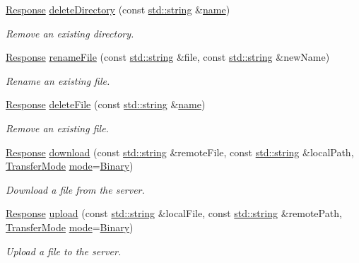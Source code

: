 \begin{DoxyCompactItemize}
\hyperlink{classsf_1_1_ftp_1_1_response}{Response} \hyperlink{classsf_1_1_ftp_a2a8a7ef9144204b5b319c9a4be8806c2}{delete\-Directory} (const \hyperlink{gl3_8h_ac83513893df92266f79a515488701770}{std\-::string} \&\hyperlink{gl3_8h_aaced7cfc21e7d37775d6921bb8177239}{name})
\begin{DoxyCompactList}\small\item\em Remove an existing directory. \end{DoxyCompactList}\item 
\hyperlink{classsf_1_1_ftp_1_1_response}{Response} \hyperlink{classsf_1_1_ftp_a8f99251d7153e1dc26723e4006deb764}{rename\-File} (const \hyperlink{gl3_8h_ac83513893df92266f79a515488701770}{std\-::string} \&file, const \hyperlink{gl3_8h_ac83513893df92266f79a515488701770}{std\-::string} \&new\-Name)
\begin{DoxyCompactList}\small\item\em Rename an existing file. \end{DoxyCompactList}\item 
\hyperlink{classsf_1_1_ftp_1_1_response}{Response} \hyperlink{classsf_1_1_ftp_a8aa272b0eb7769a850006e70fcad370f}{delete\-File} (const \hyperlink{gl3_8h_ac83513893df92266f79a515488701770}{std\-::string} \&\hyperlink{gl3_8h_aaced7cfc21e7d37775d6921bb8177239}{name})
\begin{DoxyCompactList}\small\item\em Remove an existing file. \end{DoxyCompactList}\item 
\hyperlink{classsf_1_1_ftp_1_1_response}{Response} \hyperlink{classsf_1_1_ftp_a20c1600ec5fd6f5a2ad1429ab8aa5df4}{download} (const \hyperlink{gl3_8h_ac83513893df92266f79a515488701770}{std\-::string} \&remote\-File, const \hyperlink{gl3_8h_ac83513893df92266f79a515488701770}{std\-::string} \&local\-Path, \hyperlink{classsf_1_1_ftp_a1cd6b89ad23253f6d97e6d4ca4d558cb}{Transfer\-Mode} \hyperlink{gl3_8h_a1e71d9c196e4683cc06c4b54d53f7ef5}{mode}=\hyperlink{classsf_1_1_ftp_a1cd6b89ad23253f6d97e6d4ca4d558cba6f253b362639fb5e059dc292762a21ee}{Binary})
\begin{DoxyCompactList}\small\item\em Download a file from the server. \end{DoxyCompactList}\item 
\hyperlink{classsf_1_1_ftp_1_1_response}{Response} \hyperlink{classsf_1_1_ftp_a46d6e15cddd719288b5a08b685e11765}{upload} (const \hyperlink{gl3_8h_ac83513893df92266f79a515488701770}{std\-::string} \&local\-File, const \hyperlink{gl3_8h_ac83513893df92266f79a515488701770}{std\-::string} \&remote\-Path, \hyperlink{classsf_1_1_ftp_a1cd6b89ad23253f6d97e6d4ca4d558cb}{Transfer\-Mode} \hyperlink{gl3_8h_a1e71d9c196e4683cc06c4b54d53f7ef5}{mode}=\hyperlink{classsf_1_1_ftp_a1cd6b89ad23253f6d97e6d4ca4d558cba6f253b362639fb5e059dc292762a21ee}{Binary})
\begin{DoxyCompactList}\small\item\em Upload a file to the server. \end{DoxyCompactList}\end{DoxyCompactItemize}
